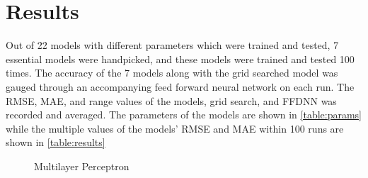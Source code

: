 \documentclass[10pt,11pt,12pt,oneside]{book}
\begin{document}
\section{Results}
Out of 22 models with different parameters which were trained and tested, 7 essential models were handpicked, and these models were trained and tested 100 times. The accuracy of the 7 models along with the grid searched model was gauged through an accompanying feed forward neural network on each run. The RMSE, MAE, and range values of the models, grid search, and FFDNN was recorded and averaged. The parameters of the models are shown in \ref{table:params} while the multiple values of the models' RMSE and MAE within 100 runs are shown in \ref{table:results}\\
\begin{figure}[H]
    \centering
    \qquad
    \caption{Multilayer Perceptron}%
    \label{fig:all_graphs}%
\end{figure}
\end{document}
